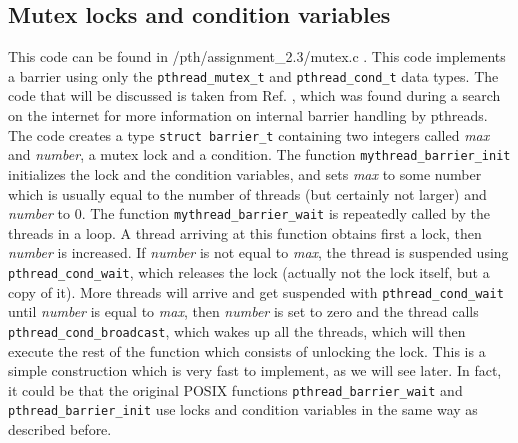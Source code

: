 \documentclass[11pt,a4paper,onecolumn]{article}
\begin{document}
\subsection{Mutex locks and condition variables}
This code can be found in /pth/assignment\_2.3/mutex.c . This code implements a barrier using only the \texttt{pthread\_mutex\_t} and \texttt{pthread\_cond\_t} data types. The code that will be discussed is taken from Ref. \cite{mutex}, which was found during a search on the internet for more information on internal barrier handling by pthreads. The code creates a type \texttt{struct barrier\_t} containing two integers called \emph{max} and \emph{number}, a mutex lock and a condition. The function \texttt{mythread\_barrier\_init} initializes the lock and the condition variables, and sets \emph{max} to some number which is usually equal to the number of threads (but certainly not larger) and \emph{number} to 0. The function \texttt{mythread\_barrier\_wait} is repeatedly called by the threads in a loop. A thread arriving at this function obtains first a lock, then \emph{number} is increased. If \emph{number} is not equal to \emph{max}, the thread is suspended using \texttt{pthread\_cond\_wait}, which releases the lock (actually not the lock itself, but a copy of it). More threads will arrive and get suspended with \texttt{pthread\_cond\_wait} until \emph{number} is equal to \emph{max}, then \emph{number} is set to zero and the thread calls \texttt{pthread\_cond\_broadcast}, which wakes up all the threads, which will then execute the rest of the function which consists of unlocking the lock. This is a simple construction which is very fast to implement, as we will see later. In fact, it could be that the original POSIX functions \texttt{pthread\_barrier\_wait} and \texttt{pthread\_barrier\_init} use locks and condition variables in the same way as described before.
\end{document}
